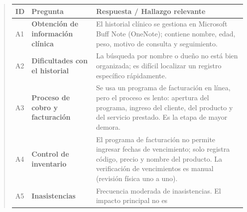 \documentclass[
]{article}
\newcounter{none} %
\begin{document}
\begin{quote}
{\def\LTcaptype{none} %
\begin{longtable}[]{|
  >{\centering\arraybackslash}p{}|
  >{\raggedright\arraybackslash}p{}|
  >{\raggedright\arraybackslash}p{}|}
\hline
\begin{minipage}[b]{\linewidth}\centering
\textbf{ID}
\end{minipage} & \begin{minipage}[b]{\linewidth}\centering
\textbf{Pregunta}
\end{minipage} & \begin{minipage}[b]{\linewidth}\raggedright
\textbf{Respuesta / Hallazgo relevante}
\end{minipage} \\
\hline
\endhead
\hline
\endlastfoot
A1 & \textbf{Obtención de información clínica} &
\begin{minipage}[t]{\linewidth}\raggedright
El historial clínico se gestiona en Microsoft Buff Note (OneNote);
contiene nombre, edad, peso, motivo de consulta y seguimiento.
\end{minipage} \\
\hline
A2 & \textbf{Dificultades con el historial} &
\begin{minipage}[t]{\linewidth}\raggedright
La búsqueda por nombre o dueño no está bien organizada; es difícil
localizar un registro específico rápidamente.
\end{minipage} \\
\hline
A3 & \textbf{Proceso de cobro y facturación} &
\begin{minipage}[t]{\linewidth}\raggedright
Se usa un programa de facturación en línea, pero el proceso es lento:
apertura del programa, ingreso del cliente, del producto y del servicio
prestado. Es la etapa de mayor demora.
\end{minipage} \\
\hline
A4 & \textbf{Control de inventario} &
\begin{minipage}[t]{\linewidth}\raggedright
El programa de facturación no permite ingresar fechas de vencimiento;
solo registra código, precio y nombre del producto. La verificación de
vencimientos es manual (revisión física uno a uno).
\end{minipage} \\
\hline
A5 & \textbf{Inasistencias} &
\begin{minipage}[t]{\linewidth}\raggedright
Frecuencia moderada de inasistencias. El impacto principal no es

\end{minipage}
\end{longtable}}
\end{quote}
\end{document}
